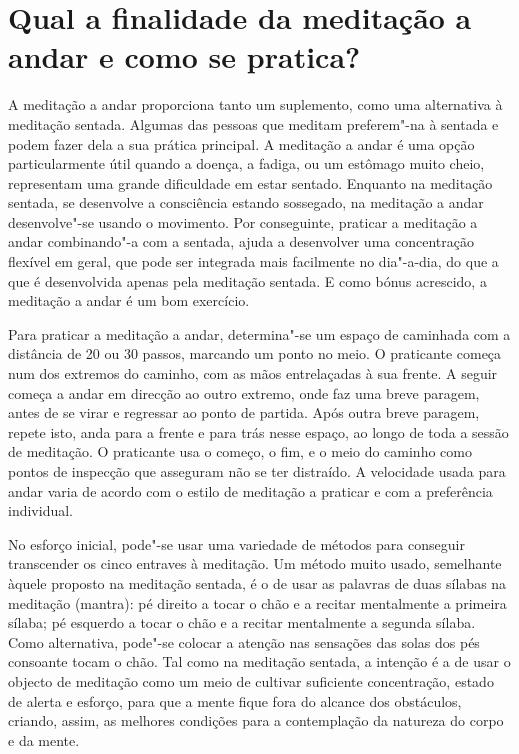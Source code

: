 \section{Qual a finalidade da meditação a andar e como se pratica?}

A meditação a andar proporciona tanto um suplemento, como uma
alternativa à meditação sentada. Algumas das pessoas que meditam
preferem"-na à sentada e podem fazer dela a sua prática principal. A
meditação a andar é uma opção particularmente útil quando a doença, a
fadiga, ou um estômago muito cheio, representam uma grande dificuldade
em estar sentado. Enquanto na meditação sentada, se desenvolve a
consciência estando sossegado, na meditação a andar desenvolve"-se usando
o movimento. Por conseguinte, praticar a meditação a andar combinando"-a
com a sentada, ajuda a desenvolver uma concentração flexível em geral,
que pode ser integrada mais facilmente no dia"-a-dia, do que a que é
desenvolvida apenas pela meditação sentada. E como bónus acrescido, a
meditação a andar é um bom exercício.

Para praticar a meditação a andar, determina"-se um espaço de caminhada
com a distância de 20 ou 30 passos, marcando um ponto no meio. O
praticante começa num dos extremos do caminho, com as mãos entrelaçadas
à sua frente{.} A seguir começa a andar em direcção ao outro extremo,
onde faz uma breve paragem, antes de se virar e regressar ao ponto de
partida. Após outra breve paragem, repete isto, anda para a frente e
para trás nesse espaço, ao longo de toda a sessão de meditação. O
praticante usa o começo, o fim, e o meio do caminho como pontos de
inspecção que asseguram não se ter distraído. A velocidade usada para
andar varia de acordo com o estilo de meditação a praticar e com a
preferência individual.

No esforço inicial, pode"-se usar uma variedade de métodos para
conseguir transcender os cinco entraves à meditação. Um método muito
usado, semelhante àquele proposto na meditação sentada, é o de usar as
palavras de duas sílabas na meditação (mantra): pé direito a tocar o
chão e a recitar mentalmente a primeira sílaba; pé esquerdo a tocar o
chão e a recitar mentalmente a segunda sílaba. Como alternativa, pode"-se
colocar a atenção nas sensações das solas dos pés consoante tocam o
chão. Tal como na meditação sentada, a intenção é a de usar o objecto de
meditação como um meio de cultivar suficiente concentração, estado de
alerta e esforço, para que a mente fique fora do alcance dos
obstáculos, criando, assim, as melhores condições para a contemplação da
natureza do corpo e da mente.

